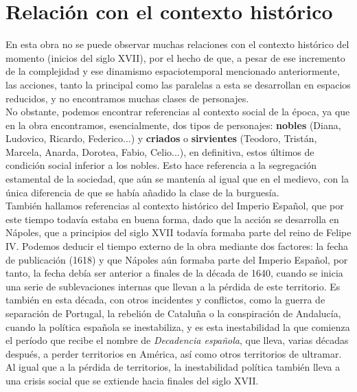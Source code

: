 \documentclass[12pt,a4paper]{article}
\begin{document}
\section{Relación con el contexto histórico}

En esta obra no se puede observar muchas relaciones con el contexto histórico del momento (inicios del siglo XVII), por el hecho de que, a pesar de ese incremento de la complejidad y ese dinamismo espaciotemporal mencionado anteriormente, las acciones, tanto la principal como las paralelas a esta se desarrollan en espacios reducidos, y no encontramos muchas clases de personajes.\\

No obstante, podemos encontrar referencias al contexto social de la época, ya que en la obra encontramos, esencialmente, dos tipos de personajes: \textbf{nobles} (Diana, Ludovico, Ricardo, Federico...) y \textbf{criados} o \textbf{sirvientes} (Teodoro, Tristán, Marcela, Anarda, Dorotea, Fabio, Celio...), en definitiva, estos últimos de condición social inferior a los nobles. Esto hace referencia a la segregación estamental de la sociedad, que aún se mantenía al igual que en el medievo, con la única diferencia de que se había añadido la clase de la burguesía.\\

También hallamos referencias al contexto histórico del Imperio Español, que por este tiempo todavía estaba en buena forma, dado que la acción se desarrolla en Nápoles, que a principios del siglo XVII todavía formaba parte del reino de Felipe IV. Podemos deducir el tiempo externo de la obra mediante dos factores: la fecha de publicación (1618) y que Nápoles aún formaba parte del Imperio Español, por tanto, la fecha debía ser anterior a finales de la década de 1640, cuando se inicia una serie de sublevaciones internas que llevan a la pérdida de este territorio. Es también en esta década, con otros incidentes y conflictos, como la guerra de separación de Portugal, la rebelión de Cataluña o la conspiración de Andalucía, cuando la política española se inestabiliza, y es esta inestabilidad la que comienza el período que recibe el nombre de \textit{Decadencia española}, que lleva, varias décadas después, a perder territorios en América, así como otros territorios de ultramar. Al igual que a la pérdida de territorios, la inestabilidad política también lleva a una crisis social que se extiende hacia finales del siglo XVII.
\end{document}

